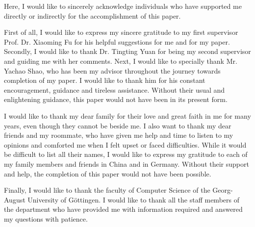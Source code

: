 Here, I would like to sincerely acknowledge individuals who have supported me directly or indirectly for the accomplishment of this paper.

First of all, I would like to express my sincere gratitude to my first supervisor Prof. Dr. Xiaoming Fu for his helpful suggestions for me and for my paper. Secondly, I would like to thank Dr. Tingting Yuan for being my second supervisor and guiding me with her comments.  Next,  I would like  to specially thank Mr. Yachao Shao, who has been my advisor throughout the journey towards completion of my paper. I would like to thank him for his constant encouragement, guidance and tireless assistance. Without their usual and enlightening guidance, this paper would not have been in its present form.

I would like to thank my dear family for their love and great faith in me for many years, even though they cannot be beside me. I also want to thank my dear friends and my roommate, who have given me help and time to listen to my opinions and comforted me when I felt upset or faced difficulties. While it would be difficult to list all their names, I would like to express my gratitude to each of my family members and friends in China and in Germany. Without their support and help, the completion of this paper would not have been possible.

Finally, I would like to thank the faculty of Computer Science of the Georg-August University of G{\"o}ttingen. I would like to thank all the staff members of the department who have provided me with information required and answered my questions with patience.

